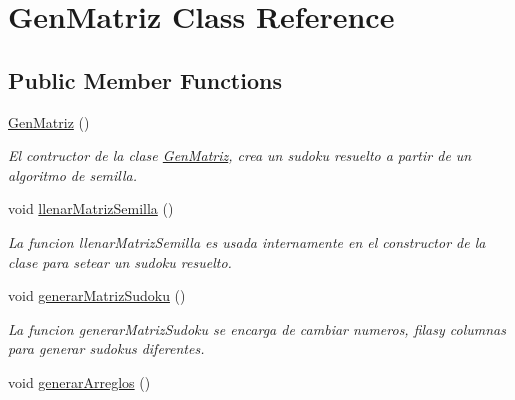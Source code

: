 \hypertarget{class_gen_matriz}{\section{Gen\-Matriz Class Reference}
\label{class_gen_matriz}
}
\subsection*{Public Member Functions}
\begin{DoxyCompactItemize}
\item 
\hypertarget{class_gen_matriz_a8fac64f00cae60f47afbf6cf43346832}{\hyperlink{class_gen_matriz_a8fac64f00cae60f47afbf6cf43346832}{Gen\-Matriz} ()}\label{class_gen_matriz_a8fac64f00cae60f47afbf6cf43346832}

\begin{DoxyCompactList}\small\item\em El contructor de la clase \hyperlink{class_gen_matriz}{Gen\-Matriz}, crea un sudoku resuelto a partir de un algoritmo de semilla. \end{DoxyCompactList}\item 
\hypertarget{class_gen_matriz_ae4e6b5ed243424a06becc3b9296fe520}{void \hyperlink{class_gen_matriz_ae4e6b5ed243424a06becc3b9296fe520}{llenar\-Matriz\-Semilla} ()}\label{class_gen_matriz_ae4e6b5ed243424a06becc3b9296fe520}

\begin{DoxyCompactList}\small\item\em La funcion llenar\-Matriz\-Semilla es usada internamente en el constructor de la clase para setear un sudoku resuelto. \end{DoxyCompactList}\item 
\hypertarget{class_gen_matriz_a68e793d89185716f36367320262723eb}{void \hyperlink{class_gen_matriz_a68e793d89185716f36367320262723eb}{generar\-Matriz\-Sudoku} ()}\label{class_gen_matriz_a68e793d89185716f36367320262723eb}

\begin{DoxyCompactList}\small\item\em La funcion generar\-Matriz\-Sudoku se encarga de cambiar numeros, filasy columnas para generar sudokus diferentes. \end{DoxyCompactList}\item 
\hypertarget{class_gen_matriz_ac8b87d3d6f8402ce11b0e8c2e54267f4}{void \hyperlink{class_gen_matriz_ac8b87d3d6f8402ce11b0e8c2e54267f4}{generar\-Arreglos} ()}\label{class_gen_matriz_ac8b87d3d6f8402ce11b0e8c2e54267f4}


\end{DoxyCompactItemize}
